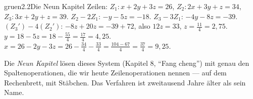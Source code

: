 \begin{loesungkarte}{gruen}{2.2}{Die Neun Kapitel}
Zeilen: $Z_1\colon x + 2y + 3z = 26$, $Z_2\colon 2x + 3y + z = 34$, $Z_3\colon 3x + 2y + z = 39$. $Z_2 - 2Z_1$: $-y - 5z = -18$. $Z_3 - 3Z_1$: $-4y - 8z = -39$.
$(Z_3') - 4(Z_2')$: $-8z + 20z = -39 + 72$, also $12z = 33$, $z = \frac{11}4 = 2{,}75$.
$y = 18 - 5z = 18 - \frac{55}4 = \frac{17}4 = 4{,}25$. $x = 26 - 2y - 3z = 26 - \frac{34}4 - \frac{33}4 = \frac{104 - 67}4 = \frac{37}4 = 9{,}25$.
\begin{mitnehmen}\kastentext
Die \emph{Neun Kapitel} lösen dieses System (Kapitel 8, \enquote{Fang cheng}) mit genau den Spaltenoperationen, die wir heute Zeilenoperationen nennen --- auf dem Rechenbrett, mit Stäbchen. Das Verfahren ist zweitausend Jahre älter als sein Name.
\end{mitnehmen}
\end{loesungkarte}

